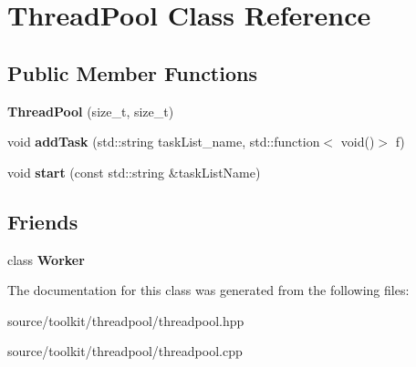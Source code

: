 \hypertarget{classThreadPool}{}\section{Thread\+Pool Class Reference}
\label{classThreadPool}
\subsection*{Public Member Functions}
\begin{DoxyCompactItemize}
\item 
\mbox{\label{classThreadPool_a9052bcce3526d07087bf0c7b168c873a}} 
{\bfseries Thread\+Pool} (size\+\_\+t, size\+\_\+t)
\item 
\mbox{\label{classThreadPool_af6a320632c1109c92cffafa6098cdaf2}} 
void {\bfseries add\+Task} (std\+::string task\+List\+\_\+name, std\+::function$<$ void()$>$ f)
\item 
\mbox{\label{classThreadPool_a9e15a4c5ae81e9d914550e6fe8ac5406}} 
void {\bfseries start} (const std\+::string \&task\+List\+Name)
\end{DoxyCompactItemize}
\subsection*{Friends}
\begin{DoxyCompactItemize}
\item 
\mbox{\label{classThreadPool_a9de4a9533dff2ecc0919852d4c05a67b}} 
class {\bfseries Worker}
\end{DoxyCompactItemize}


The documentation for this class was generated from the following files\+:\begin{DoxyCompactItemize}
\item 
source/toolkit/threadpool/threadpool.\+hpp\item 
source/toolkit/threadpool/threadpool.\+cpp\end{DoxyCompactItemize}
